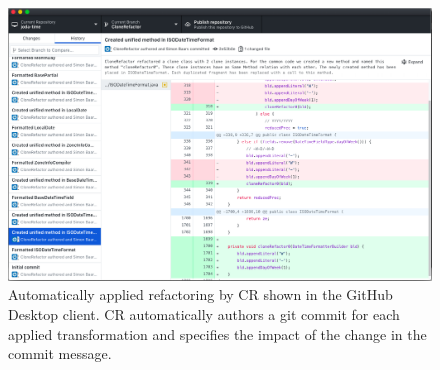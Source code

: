 \documentclass[sigconf,review,anonymous]{acmart}
\begin{document}
\begin{figure}
    \centering
    \includegraphics[width=1\columnwidth]{img/cr.png}
    \caption{Automatically applied refactoring by CR shown in the GitHub Desktop client. CR automatically authors a git commit for each applied transformation and specifies the impact of the change in the commit message.}
    \label{fig:cr_refactoring}
\end{figure}
\end{document}
